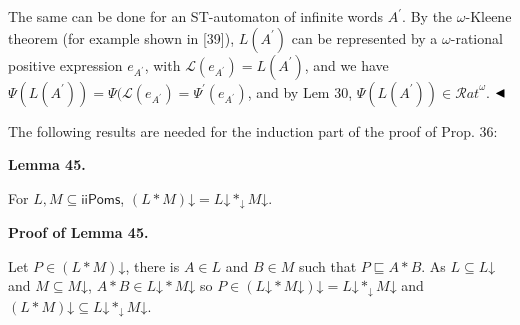  
 
The same can be done for an ST-automaton of infinite words $A^{\prime}$. By the $\omega$-Kleene theorem (for example shown in [39]), $L(A^{\prime})$ can be represented by a $\omega$-rational positive expression $e_{A^{\prime}}$, with $\mathcal{L}(e_{A^{\prime}})=L(A^{\prime})$, and we have $\Psi(L(A^{\prime}))=\Psi(\mathcal{L}(e_{A^{\prime}})=\Psi^{\prime}(e_{A^{\prime}})$, and by Lem 30, $\Psi(L(A^{\prime}))\in{\mathcal{R}at}^{\omega}$. $\hfill\blacktriangleleft$\par
 
 
 
The following results are needed for the induction part of the proof of Prop. 36:\par
 
 
 
\par\medskip\noindent\textbf{Lemma 45.}\par
 
 
For $L,M\subseteq\mathsf{iiPoms}$, $(L*M)\mathord{\downarrow}=L\mathord{\downarrow}*_{\mathord{\downarrow}}M\mathord{\downarrow}$.\par
 
 
 
 
 
\par\medskip\noindent\textbf{Proof of Lemma 45.}\par
 
 
Let $P\in(L*M)\mathord{\downarrow}$, there is $A\in L$ and $B\in M$ such that $P\sqsubseteq A*B$. As $L\subseteq L\mathord{\downarrow}$ and $M\subseteq M\mathord{\downarrow}$, $A*B\in L\mathord{\downarrow}*M\mathord{\downarrow}$ so $P\in(L\mathord{\downarrow}*M\mathord{\downarrow})\mathord{\downarrow}=L\mathord{\downarrow}*_{\mathord{\downarrow}}M\mathord{\downarrow}$ and $(L*M)\mathord{\downarrow}\subseteq L\mathord{\downarrow}*_{\mathord{\downarrow}}M\mathord{\downarrow}$.\par
 
